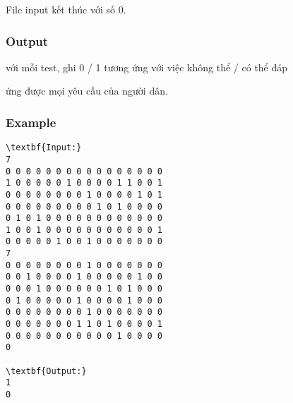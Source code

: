 File input kết thúc với số 0.

\subsubsection{Output}

với mỗi test, ghi 0 / 1 tương ứng với việc không thể / có thể đáp

ứng được mọi yêu cầu của người dân.

\subsubsection{Example}
\begin{verbatim}
\textbf{Input:}
7
0 0 0 0 0 0 0 0 0 0 0 0 0 0 0 0
1 0 0 0 0 0 1 0 0 0 0 1 1 0 0 1
0 0 0 0 0 0 0 0 1 0 0 0 0 1 0 1
0 0 0 0 0 0 0 0 0 1 0 1 0 0 0 0
0 1 0 1 0 0 0 0 0 0 0 0 0 0 0 0
1 0 0 1 0 0 0 0 0 0 0 0 0 0 0 1
0 0 0 0 0 1 0 0 1 0 0 0 0 0 0 0
7
0 0 0 0 0 0 0 0 1 0 0 0 0 0 0 0
0 0 1 0 0 0 0 1 0 0 0 0 0 1 0 0
0 0 0 1 0 0 0 0 0 0 1 0 1 0 0 0
0 1 0 0 0 0 0 1 0 0 0 0 1 0 0 0
0 0 0 0 0 0 0 0 1 0 0 0 0 0 0 0
0 0 0 0 0 0 0 1 1 0 1 0 0 0 0 1
0 0 0 0 0 0 0 0 0 0 0 1 0 0 0 0
0

\textbf{Output:}
1
0\end{verbatim}